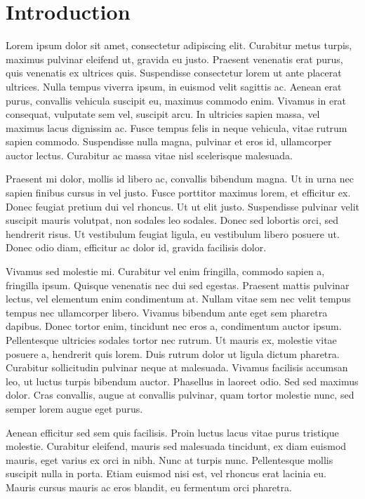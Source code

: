 
\section{Introduction}

Lorem ipsum dolor sit amet, consectetur adipiscing elit. Curabitur metus turpis, maximus pulvinar eleifend ut, gravida eu justo. Praesent venenatis erat purus, quis venenatis ex ultrices quis. Suspendisse consectetur lorem ut ante placerat ultrices. Nulla tempus viverra ipsum, in euismod velit sagittis ac. Aenean erat purus, convallis vehicula suscipit eu, maximus commodo enim. Vivamus in erat consequat, vulputate sem vel, suscipit arcu. In ultricies sapien massa, vel maximus lacus dignissim ac. Fusce tempus felis in neque vehicula, vitae rutrum sapien commodo. Suspendisse nulla magna, pulvinar et eros id, ullamcorper auctor lectus. Curabitur ac massa vitae nisl scelerisque malesuada.

Praesent mi dolor, mollis id libero ac, convallis bibendum magna. Ut in urna nec sapien finibus cursus in vel justo. Fusce porttitor maximus lorem, et efficitur ex. Donec feugiat pretium dui vel rhoncus. Ut ut elit justo. Suspendisse pulvinar velit suscipit mauris volutpat, non sodales leo sodales. Donec sed lobortis orci, sed hendrerit risus. Ut vestibulum feugiat ligula, eu vestibulum libero posuere ut. Donec odio diam, efficitur ac dolor id, gravida facilisis dolor.

Vivamus sed molestie mi. Curabitur vel enim fringilla, commodo sapien a, fringilla ipsum. Quisque venenatis nec dui sed egestas. Praesent mattis pulvinar lectus, vel elementum enim condimentum at. Nullam vitae sem nec velit tempus tempus nec ullamcorper libero. Vivamus bibendum ante eget sem pharetra dapibus. Donec tortor enim, tincidunt nec eros a, condimentum auctor ipsum. Pellentesque ultricies sodales tortor nec rutrum. Ut mauris ex, molestie vitae posuere a, hendrerit quis lorem. Duis rutrum dolor ut ligula dictum pharetra. Curabitur sollicitudin pulvinar neque at malesuada. Vivamus facilisis accumsan leo, ut luctus turpis bibendum auctor. Phasellus in laoreet odio. Sed sed maximus dolor. Cras convallis, augue at convallis pulvinar, quam tortor molestie nunc, sed semper lorem augue eget purus.

Aenean efficitur sed sem quis facilisis. Proin luctus lacus vitae purus tristique molestie. Curabitur eleifend, mauris sed malesuada tincidunt, ex diam euismod mauris, eget varius ex orci in nibh. Nunc at turpis nunc. Pellentesque mollis suscipit nulla in porta. Etiam euismod nisi est, vel rhoncus erat lacinia eu. Mauris cursus mauris ac eros blandit, eu fermentum orci pharetra.

